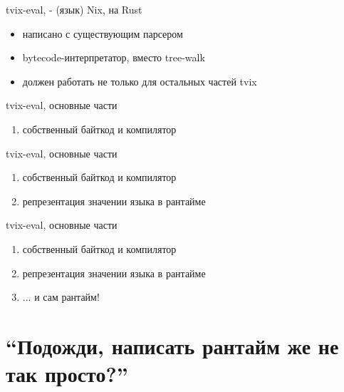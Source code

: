 \documentclass[12pt]{beamer}
\begin{document}
  \begin{frame}{tvix-eval, - (язык) Nix, на Rust}
    \begin{itemize}
    \item написано с существующим парсером
    \item bytecode-интерпретатор, вместо tree-walk
    \item должен работать не только для остальных частей tvix
    \end{itemize}
  \end{frame}

  \begin{frame}{tvix-eval, основные части}
    \begin{enumerate}
    \item собственный байткод и компилятор
    \end{enumerate}
  \end{frame}


  \begin{frame}{tvix-eval, основные части}
    \begin{enumerate}
    \item собственный байткод и компилятор
    \item репрезентация значении языка в рантайме
    \end{enumerate}
  \end{frame}


  \begin{frame}{tvix-eval, основные части}
    \begin{enumerate}
    \item собственный байткод и компилятор
    \item репрезентация значении языка в рантайме
    \item ... и сам рантайм!
    \end{enumerate}
  \end{frame}


  \section{``Подожди, написать рантайм же не так просто?''}

\end{document}
